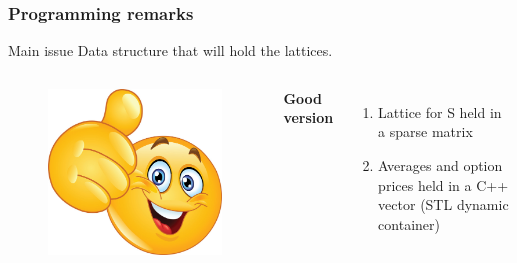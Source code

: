 \documentclass{beamer}
\begin{document}
\begin{frame}
\frametitle{Programming remarks}

\begin{block}{Main issue}
Data structure that will hold the lattices.
\end{block}
\vspace{10mm}

\begin{columns}[b] %

\begin{figure}
	\includegraphics[scale=0.15]{yes}
\end{figure}

\textbf{Good version}
\begin{enumerate}
\item Lattice for S held in a sparse matrix
\item Averages and option prices held in a C++ vector (STL dynamic container)
\end{enumerate}

\end{columns}
\end{frame}
\end{document}
